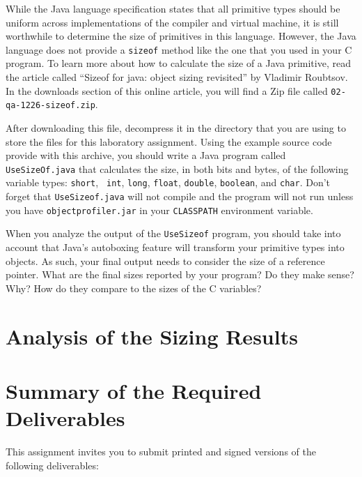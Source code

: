   While the Java language specification states that all primitive types should be uniform across implementations of the
  compiler and virtual machine, it is still worthwhile to determine the size of primitives in this language. However,
  the Java language does not provide a {\tt sizeof} method like the one that you used in your C program. To learn more
  about how to calculate the size of a Java primitive, read the article called ``Sizeof for java: object sizing
  revisited'' by Vladimir Roubtsov. In the downloads section of this online article, you will find a Zip file called
  {\tt 02-qa-1226-sizeof.zip}. 

  After downloading this file, decompress it in the directory that you are using to store the files for this laboratory
  assignment. Using the example source code provide with this archive, you should write a Java program called {\tt
  UseSizeOf.java} that calculates the size, in both bits and bytes, of the following variable types:  {\tt short}, {\tt
  int}, {\tt long}, {\tt float}, {\tt double}, {\tt boolean}, and {\tt char}. Don't forget that {\tt UseSizeof.java}
  will not compile and the program will not run unless you have {\tt objectprofiler.jar} in your {\tt CLASSPATH}
  environment variable. 
  
  When you analyze the output of the {\tt UseSizeof} program, you should take into account that Java's autoboxing
  feature will transform your primitive types into objects.  As such, your final output needs to consider the size of a
  reference pointer. What are the final sizes reported by your program? Do they make sense? Why? How do they compare to
  the sizes of the C variables?

\section*{Analysis of the Sizing Results}

  

\section*{Summary of the Required Deliverables}

This assignment invites you to submit printed and signed versions of the following deliverables: 

